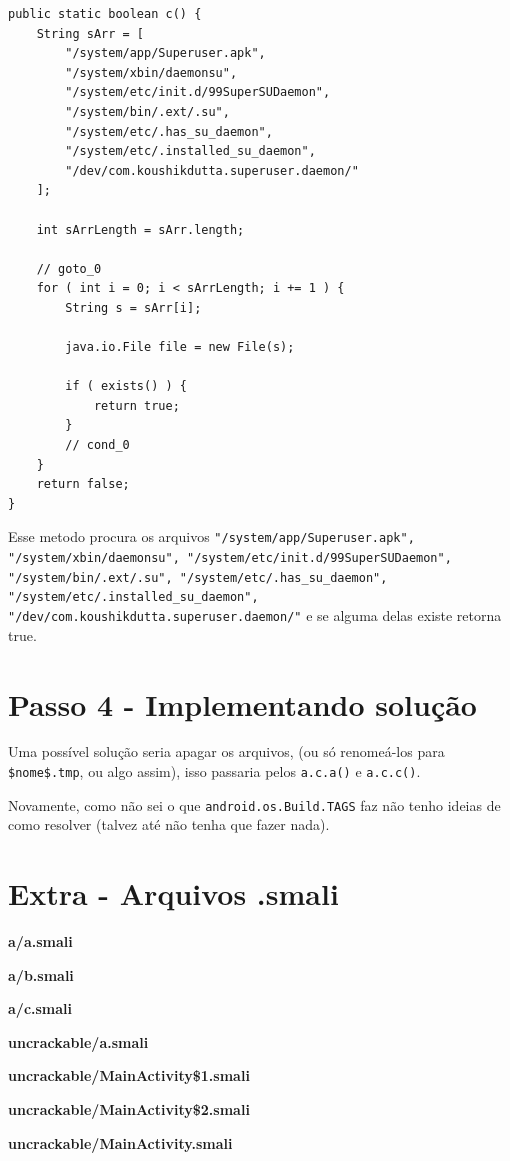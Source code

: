 \documentclass{article}
\begin{document}
\begin{verbatim}
public static boolean c() {
    String sArr = [
        "/system/app/Superuser.apk",
        "/system/xbin/daemonsu",
        "/system/etc/init.d/99SuperSUDaemon",
        "/system/bin/.ext/.su",
        "/system/etc/.has_su_daemon",
        "/system/etc/.installed_su_daemon",
        "/dev/com.koushikdutta.superuser.daemon/"
    ];

    int sArrLength = sArr.length;

    // goto_0
    for ( int i = 0; i < sArrLength; i += 1 ) {
        String s = sArr[i];

        java.io.File file = new File(s);

        if ( exists() ) {
            return true;
        }
        // cond_0
    }
    return false;
}
\end{verbatim}

Esse metodo procura os arquivos
\texttt{"/system/app/Superuser.apk",
        "/system/xbin/daemonsu",
        "/system/etc/init.d/99SuperSUDaemon",
        "/system/bin/.ext/.su",
        "/system/etc/.has\_su\_daemon",
        "/system/etc/.installed\_su\_daemon",
        "/dev/com.koushikdutta.superuser.daemon/"}
e se alguma delas existe retorna true.

\newpage
\section*{Passo 4 - Implementando solução}

Uma possível solução seria apagar os arquivos,
(ou só renomeá-los para \texttt{\$nome\$.tmp},
ou algo assim),
isso passaria pelos \texttt{a.c.a()}
e \texttt{a.c.c()}.

Novamente, como não sei o que
\texttt{android.os.Build.TAGS} faz
não tenho ideias de como resolver
(talvez até não tenha que fazer nada).

\newpage
\section*{Extra - Arquivos .smali}

\textbf{a/a.smali}
    

\textbf{a/b.smali}
    

\textbf{a/c.smali}
    

\textbf{uncrackable/a.smali}
    

\textbf{uncrackable/MainActivity\$1.smali}
    

\textbf{uncrackable/MainActivity\$2.smali}
    

\textbf{uncrackable/MainActivity.smali}
    
\end{document}
